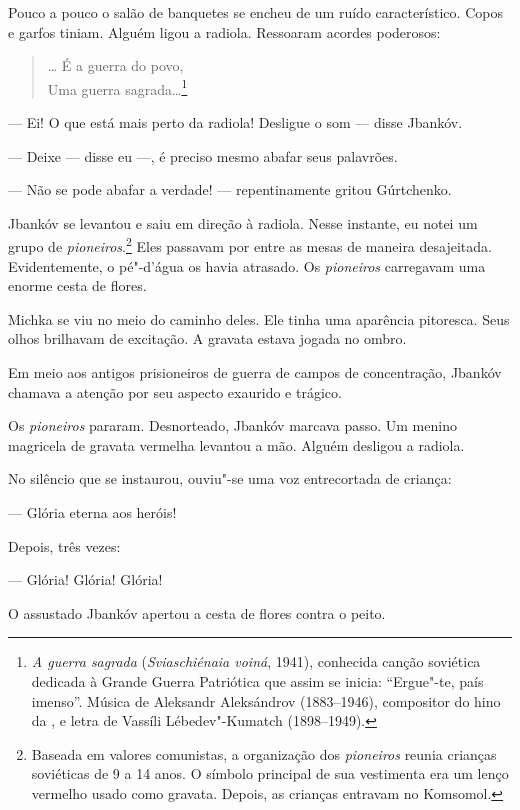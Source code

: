 Pouco a pouco o salão de banquetes se encheu de um ruído característico.
Copos e garfos tiniam. Alguém ligou a radiola. Ressoaram acordes
poderosos:

\begin{verse}
\ldots{} É a guerra do povo,\\
Uma guerra sagrada\ldots{}\footnote{\emph{A guerra sagrada}
  (\emph{Sviaschiénaia voiná}, 1941), conhecida canção soviética
  dedicada à Grande Guerra Patriótica que assim se inicia: ``Ergue"-te,
  país imenso''. Música de Aleksandr Aleksándrov (1883--1946),
  compositor do hino da , e letra de Vassíli Lébedev"-Kumatch
  (1898--1949).}
\end{verse}

--- Ei! O que está mais perto da radiola! Desligue o som --- disse
Jbankóv.

--- Deixe --- disse eu ---, é preciso mesmo abafar seus palavrões.

--- Não se pode abafar a verdade! --- repentinamente gritou Gúrtchenko.

Jbankóv se levantou e saiu em direção à radiola. Nesse instante, eu
notei um grupo de \emph{pioneiros}.\footnote{Baseada em valores
  comunistas, a organização dos \emph{pioneiros} reunia crianças
  soviéticas de 9 a 14 anos. O símbolo principal de sua vestimenta era
  um lenço vermelho usado como gravata. Depois, as crianças entravam no
  Komsomol.} Eles passavam por entre as mesas de maneira desajeitada.
Evidentemente, o pé"-d'água os havia atrasado. Os \emph{pioneiros}
carregavam uma enorme cesta de flores.

Michka se viu no meio do caminho deles. Ele tinha uma aparência
pitoresca. Seus olhos brilhavam de excitação. A gravata estava jogada no
ombro.

Em meio aos antigos prisioneiros de guerra de campos de concentração,
Jbankóv chamava a atenção por seu aspecto exaurido e trágico.

Os \emph{pioneiros} pararam. Desnorteado, Jbankóv marcava passo. Um
menino magricela de gravata vermelha levantou a mão. Alguém desligou a
radiola.

No silêncio que se instaurou, ouviu"-se uma voz entrecortada de criança:

--- Glória eterna aos heróis!

Depois, três vezes:

--- Glória! Glória! Glória!

O assustado Jbankóv apertou a cesta de flores contra o peito.

